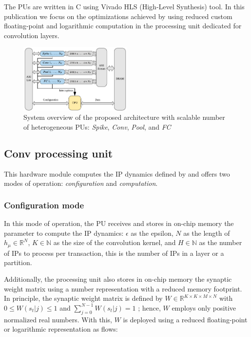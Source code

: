 The PUs are written in C using Vivado HLS (High-Level Synthesis) tool. In this publication we focus on the optimizations achieved by using reduced custom floating-point and logarithmic computation in the processing unit dedicated for convolution layers.

\begin{figure}
	\centering
	\includegraphics[width=0.5\textwidth]{../figures/sbs_hw.pdf}
	\caption{System overview of the proposed architecture with scalable number of heterogeneous PUs: \emph{Spike}, \emph{Conv}, \emph{Pool}, and \emph{FC}}
	\label{fig:hw_sbs}
\end{figure}

\subsection{Conv processing unit}
This hardware module computes the IP dynamics defined by  and offers two modes of operation: \emph{configuration} and \emph{computation}.

\subsubsection{Configuration mode}
In this mode of operation, the PU receives and stores in on-chip memory the parameter to compute the IP dynamics: $\epsilon$ as the epsilon, $N$ as the length of $h_\mu\in\mathbb{R}^{N}$, $K\in\mathbb{N}$ as the size of the convolution kernel, and $H\in\mathbb{N}$ as the number of IPs to process per transaction, this is the number of IPs in a layer or a partition.

Additionally, the processing unit also stores in on-chip memory the synaptic weight matrix using a number representation with a reduced memory footprint. In principle, the synaptic weight matrix is defined by $W\in\mathbb{R}^{K\times K\times M\times N}$ with $0\le W(s_t|j)\le1$ and $\sum_{j=0}^{N-1}W(s_t|j)=1$ \cite{rotermund2019Backpropagation}; hence, $W$ employs only positive normalized real numbers. With this, $W$ is deployed using a reduced floating-point or logarithmic representation as flows:

